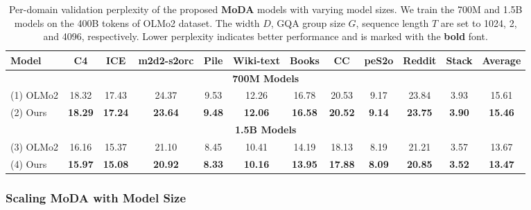 \documentclass[]{bytedance_seed}
\newcommand{\name}{MoDA}
\begin{document}
\begin{table}[t]
    \caption{Per-domain validation perplexity of the proposed \textbf{\name} models with varying model sizes.
    We train the 700M and 1.5B models on the 400B tokens of OLMo2 dataset.
    The width $D$, GQA group size $G$, sequence length $T$ are set to 1024, 2, and 4096, respectively.
    Lower perplexity indicates better performance and is marked with the \textbf{bold} font.
    }
    \label{tab:domain_ppl_results}
    \centering
    \footnotesize
    \begin{tabular}{l|ccccccccccc}
    \toprule
    Model & C4 & ICE & m2d2-s2orc & Pile & Wiki-text & Books & CC & peS2o & Reddit & Stack & Average \\
    \midrule
    \multicolumn{12}{c}{\bfseries 700M Models} \\
    \midrule
    (1) OLMo2 & 18.32 & 17.43 & 24.37 & 9.53 & 12.26 & 16.78 & 20.53 & 9.17 & 23.84 & 3.93 & 15.61 \\
    (2) Ours & \textbf{18.29} & \textbf{17.24} & \textbf{23.64} & \textbf{9.48} & \textbf{12.06} & \textbf{16.58} & \textbf{20.52} & \textbf{9.14} & \textbf{23.75} & \textbf{3.90} & \textbf{15.46} \\
    \midrule
    \multicolumn{12}{c}{\bfseries 1.5B Models} \\
    \midrule
    (3) OLMo2 & 16.16 & 15.37 & 21.10 & 8.45 & 10.41 & 14.19 & 18.13 & 8.19 & 21.21 & 3.57 & 13.67 \\
    (4) Ours & \textbf{15.97} & \textbf{15.08} & \textbf{20.92} & \textbf{8.33} & \textbf{10.16} & \textbf{13.95} & \textbf{17.88} & \textbf{8.09} & \textbf{20.85} & \textbf{3.52} & \textbf{13.47} \\
    \bottomrule
    \end{tabular}
\end{table}

\subsubsection{Scaling \name{} with Model Size}
\label{subsec:scaling_moda}
\end{document}
